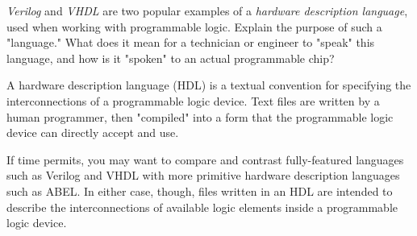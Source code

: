 

{\it Verilog} and {\it VHDL} are two popular examples of a {\it hardware description language}, used when working with programmable logic.  Explain the purpose of such a "language."  What does it mean for a technician or engineer to "speak" this language, and how is it "spoken" to an actual programmable chip?







A hardware description language (HDL) is a textual convention for specifying the interconnections of a programmable logic device.  Text files are written by a human programmer, then "compiled" into a form that the programmable logic device can directly accept and use.







If time permits, you may want to compare and contrast fully-featured languages such as Verilog and VHDL with more primitive hardware description languages such as ABEL.  In either case, though, files written in an HDL are intended to describe the interconnections of available logic elements inside a programmable logic device.




